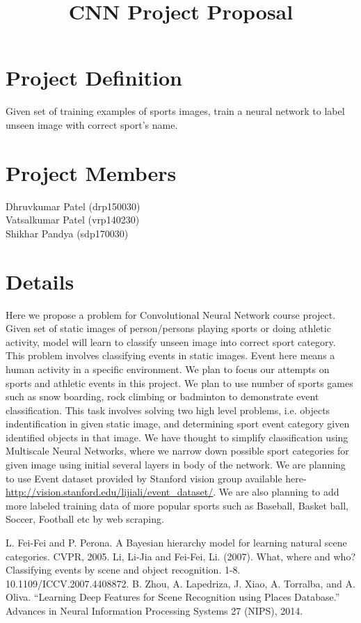 \documentclass{article}
\title{CNN Project Proposal}
\begin{document}
\maketitle
\section{Project Definition}
Given set of training examples of sports images, train a neural network to label unseen image with correct sport's name.
\section{Project Members}
Dhruvkumar Patel (drp150030)\\Vatsalkumar Patel (vrp140230)\\Shikhar Pandya (sdp170030)
\section{Details}
Here we propose a problem for Convolutional Neural Network course project. Given set of static images of person/persons playing sports or doing athletic activity, model will learn to classify unseen image into correct sport category. This problem involves classifying events in static images. Event here means a human activity in a specific environment. We plan to focus our attempts on sports and athletic events in this project. We plan to use number of sports games such as snow boarding, rock climbing or badminton to demonstrate event classification. This task involves solving two high level problems, i.e. objects indentification in given static image, and determining sport event category given identified objects in that image. We have thought to simplify classification using Multiscale Neural Networks, where we narrow down possible sport categories for given image using initial several layers in body of the network. We are planning to use Event dataset provided by Stanford vision group available here- \url{http://vision.stanford.edu/lijiali/event_dataset/}. We are also planning to add more labeled training data of more popular sports such as Baseball, Basket ball, Soccer, Football etc by web scraping.
\begin{thebibliography}{9}
    L. Fei-Fei and P. Perona. A Bayesian hierarchy model for learning natural scene categories. CVPR, 2005.
    Li, Li-Jia and Fei-Fei, Li. (2007). What, where and who? Classifying events by scene and object recognition. 1-8. 10.1109/ICCV.2007.4408872. 
    B. Zhou, A. Lapedriza, J. Xiao, A. Torralba, and A. Oliva. “Learning Deep Features for Scene Recognition using Places Database.” Advances in Neural Information Processing Systems 27 (NIPS), 2014. 
\end{thebibliography}
\end{document}
